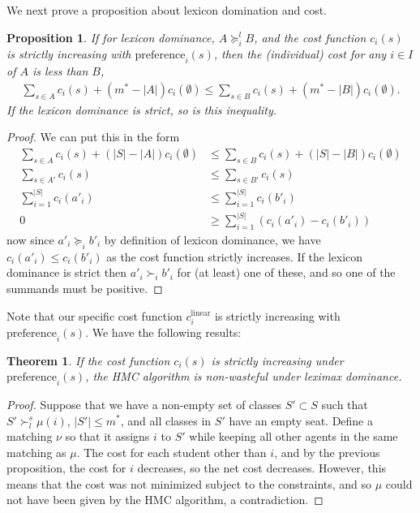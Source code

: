 \documentclass[12pt,letterpaper]{extarticle}
\newtheorem{prop}{Proposition}
\newtheorem{theo}{Theorem}
\begin{document}
We next prove a proposition about lexicon domination and cost.

\begin{prop}
If for lexicon dominance, $A \succcurlyeq^l_i B$, and the cost function $c_i(s)$ is strictly increasing with $\mathrm{preference}_i(s)$, then the (individual) cost for any $i \in I$ of $A$ is less than $B$,
\begin{align*}
     \sum_{s \in A} c_i(s) + (m^* - |A|) c_i(\emptyset) \leq \sum_{s \in B} c_i(s) + (m^* - |B|) c_i(\emptyset).
\end{align*}
If the lexicon dominance is strict, so is this inequality.
\end{prop}

\begin{proof}
We can put this in the form
\begin{align*}
     \sum_{s \in A} c_i(s) + (|S| - |A|) c_i(\emptyset) &\leq \sum_{s \in B} c_i(s) + (|S| - |B|) c_i(\emptyset) \\
     \sum_{s \in A'} c_i(s)  &\leq \sum_{s \in B'} c_i(s) \\
     \sum_{i = 1}^{|S|} c_i(a'_i) &\leq \sum_{i = 1}^{|S|} c_i(b'_i) \\
     0 &\geq \sum_{i = 1}^{|S|} (c_i(a'_i) - c_i(b'_i))
\end{align*}
now since $a'_i \succcurlyeq_i b'_i$ by definition of lexicon dominance, we have $c_i(a'_i) \leq c_i(b'_i)$ as the cost function strictly increases. If the lexicon dominance is strict then $a'_i \succ_i b'_i$ for (at least) one of these, and so one of the summands must be positive.
\end{proof}

Note that our specific cost function $c^{\mathrm{linear}}_i$ is strictly increasing with $\mathrm{preference}_i(s)$. We have the following results:

\begin{theo}
If the cost function $c_i(s)$ is strictly increasing under $\mathrm{preference}_i(s)$, the HMC algorithm is non-wasteful under leximax dominance.
\end{theo}

\begin{proof}
Suppose that we have a non-empty set of classes $S' \subset S$ such that $S' \succ^s_l \mu(i)$, $|S'| \leq m^*$, and all classes in $S'$ have an empty seat. Define a matching $\nu$ so that it assigns $i$ to $S'$ while keeping all other agents in the same matching as $\mu$. The cost for each student other than $i$, and by the previous proposition, the cost for $i$ decreases, so the net cost decreases. However, this means that the cost was not minimized subject to the constraints, and so $\mu$ could not have been given by the HMC algorithm, a contradiction.
\end{proof}
\end{document}
